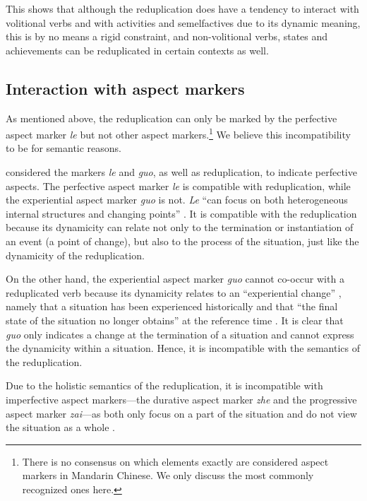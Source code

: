 \documentclass[11pt,a4paper,fleqn,draft]{article}
\begin{document}
This shows that although the reduplication does have a tendency to interact with volitional verbs and with activities and semelfactives due to its dynamic meaning, 
this is by no means a rigid constraint, 
and non\hyp{}volitional verbs, states and achievements can be reduplicated in certain contexts as well.




\subsection{Interaction with aspect markers}\label{sec:aspM}

As mentioned above, the reduplication can only be marked by the perfective aspect marker \emph{le} but not other aspect markers.\footnote{
There is no consensus on which elements exactly are considered aspect markers in Mandarin Chinese. We only discuss the most commonly recognized ones here.
}
We believe this incompatibility to be for semantic reasons.

\citet[Ch. 4]{XiaoMcEnery2004} considered the markers \emph{le} and \emph{guo}, as well as reduplication, to indicate perfective aspects.
The perfective aspect marker \emph{le} is compatible with reduplication, while the experiential aspect marker \emph{guo} is not.
\emph{Le} ``can focus on both heterogeneous internal structures and changing points'' \citep[129]{XiaoMcEnery2004}.
It is compatible with the reduplication because its dynamicity can relate not only to the termination or instantiation of an event (a point of change), but also to the process of the situation, just like the dynamicity of the reduplication.

On the other hand, the experiential aspect marker \emph{guo} cannot co\hyp{}occur with a reduplicated verb 
because its dynamicity relates to an ``experiential change'' \citep[148]{XiaoMcEnery2004}, 
namely that a situation has been experienced historically and that ``the final state of the situation no longer obtains'' at the reference time \citep[144]{XiaoMcEnery2004}. 
It is clear that \emph{guo} only indicates a change at the termination of a situation and cannot express the dynamicity within a situation.
Hence, it is incompatible with the semantics of the reduplication.

Due to the holistic semantics of the reduplication, it is incompatible with imperfective aspect markers---the durative aspect marker \emph{zhe} and the progressive aspect marker \emph{zai}---as both only focus on  a part of the situation and do not view the situation as a whole \citep[Ch. 5]{XiaoMcEnery2004}.
\end{document}
